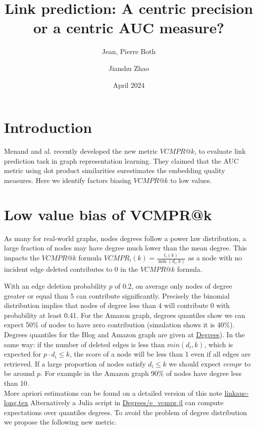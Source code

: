\documentclass{article}
\title{Link prediction: A centric precision or a centric AUC measure?}
\author[1,*]{Jean, Pierre Both}
\author[2]{Jianshu Zhao}
\affil[1]{Université Paris-Saclay, CEA, List, Palaiseau, France. (Retired)}
\affil[2]{Center for Bioinformatics and Computational Genomics, Georgia Institute of Technology, Atlanta, Georgia, USA}
\affil[*]{Corresponding author : jeanpierre.both@gmail.com}
\date{April 2024}
\begin{document}
\maketitle

\section{Introduction}

Menand and al. \cite{Menand2024link} recently developed the new metric $VCMPR@k$, to evaluate link prediction task in graph representation learning.
They claimed that the AUC metric using dot product similarities surestimates the embedding quality measures.
Here we identify factors biasing $VCMPR@k$ to low values.


\section{Low value bias of VCMPR@k}

As many for real-world graphs, nodes degrees follow a power law distribution, a large fraction of nodes may have degree much lower than the mean degree.
This impacts the $VCMPR@k$ formula $ VCMPR_{i}(k)= \frac{t_{i}(k)}{\min(d_{i},k)}$ as a node with no incident edge deleted contributes to 0 in the $VCMPR@k$ formula.

With an edge deletion probability $p$ of 0.2, on average only nodes of degree greater or equal than 5 can contribute significantly. Precisely the binomial distribution implies that nodes of degree less than 4 will contribute 0 with probability at least 0.41.
For the Amazon graph, degrees quantiles show we can expect 50\% of nodes to have zero contribution (simulation shows it is 40\%).
Degrees quantiles for the Blog and Amazon graph are given at \href{https://github.com/jean-pierreBoth/linkauc/tree/master/Degrees}{\color{blue}Degrees}).
In the same way: if the number of deleted edges is less than $min(d_{i},k)$, which is expected for $p \cdot d_{i} \leq k$, the score of a node will be less than 1 even if all edges are retrieved.
If a large proportion of nodes satisfy $d_{i} \le k$ we should expect $vcmpr$ to be around $p$. For example in the Amazon graph 90\% of nodes have degree less than 10.\\
More apriori estimations can be found on a detailed version of this note \href{https://github.com/jean-pierreBoth/linkauc/tree/master/Latex}{\color{blue}linkauc-long.tex}
Alternatively a Julia script in \href{https://github.com/jean-pierreBoth/linkauc/tree/master/Degrees}{\color{blue}Degrees/e\_vcmpr.jl} can compute expectations over quantiles degrees.
To avoid the problem of degree distribution we propose the following new metric.
\end{document}
